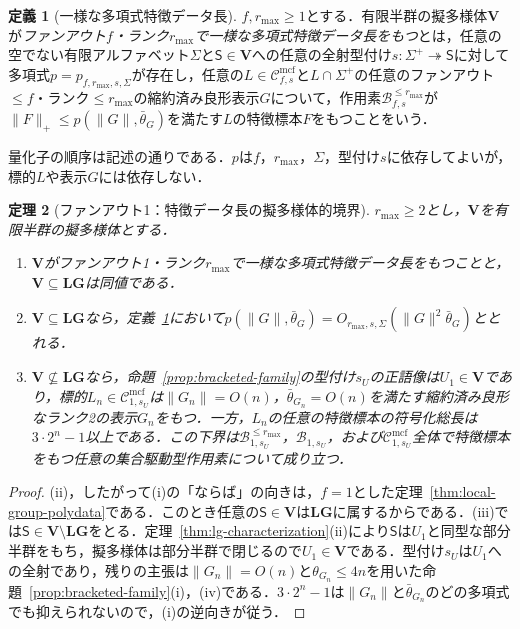 \documentclass[11pt,a4paper]{ltjsarticle}
\numberwithin{equation}{section}
\theoremstyle{plain}
\newtheorem{theorem}{定理}[section]
\theoremstyle{definition}
\newtheorem{definition}[theorem]{定義}
\theoremstyle{remark}
\newcommand{\Cmcf}[2]{\mathcal{C}^{\mathrm{mcf}}_{#1,#2}}
\begin{document}
\begin{definition}[一様な多項式特徴データ長]
\label{def:uniform-polydata}
$f,r_{\max}\ge1$とする．有限半群の擬多様体$\mathbf V$が\emph{ファンアウト$f$・ランク$r_{\max}$で一様な多項式特徴データ長をもつ}とは，任意の空でない有限アルファベット$\Sigma$と$\mathsf S\in\mathbf V$への任意の全射型付け$s:\Sigma^+\twoheadrightarrow\mathsf S$に対して多項式$p=p_{f,r_{\max},s,\Sigma}$が存在し，任意の$L\in\Cmcf{f}{s}$と$L\cap\Sigma^+$の任意のファンアウト$\le f$・ランク$\le r_{\max}$の縮約済み良形表示$G$について，作用素$\mathcal B^{\le r_{\max}}_{f,s}$が$\|F\|_+\le p(\|G\|,\bar\theta_G)$を満たす$L$の特徴標本$F$をもつことをいう．
\end{definition}

量化子の順序は記述の通りである．$p$は$f$，$r_{\max}$，$\Sigma$，型付け$s$に依存してよいが，標的$L$や表示$G$には依存しない．

\begin{theorem}[ファンアウト1：特徴データ長の擬多様体的境界]
\label{thm:fanout-one-data}
$r_{\max}\ge2$とし，$\mathbf V$を有限半群の擬多様体とする．
\begin{enumerate}[label=\textup{(\roman*)},leftmargin=*]
\item $\mathbf V$がファンアウト1・ランク$r_{\max}$で一様な多項式特徴データ長をもつことと，$\mathbf V\subseteq\mathbf{LG}$は同値である．
\item $\mathbf V\subseteq\mathbf{LG}$なら，定義~\ref{def:uniform-polydata}において$p(\|G\|,\bar\theta_G)=O_{r_{\max},s,\Sigma}(\|G\|^2\bar\theta_G)$ととれる．
\item $\mathbf V\not\subseteq\mathbf{LG}$なら，命題~\ref{prop:bracketed-family}の型付け$s_U$の正語像は$U_1\in\mathbf V$であり，標的$L_n\in\Cmcf{1}{s_U}$は$\|G_n\|=O(n)$，$\bar\theta_{G_n}=O(n)$を満たす縮約済み良形なランク2の表示$G_n$をもつ．一方，$L_n$の任意の特徴標本の符号化総長は$3\cdot2^n-1$以上である．この下界は$\mathcal B^{\le r_{\max}}_{1,s_U}$，$\mathcal B_{1,s_U}$，および$\Cmcf{1}{s_U}$全体で特徴標本をもつ任意の集合駆動型作用素について成り立つ．
\end{enumerate}
\end{theorem}

\begin{proof}
(ii)，したがって(i)の「ならば」の向きは，$f=1$とした定理~\ref{thm:local-group-polydata}である．このとき任意の$\mathsf S\in\mathbf V$は$\mathbf{LG}$に属するからである．(iii)では$\mathsf S\in\mathbf V\setminus\mathbf{LG}$をとる．定理~\ref{thm:lg-characterization}(ii)により$\mathsf S$は$U_1$と同型な部分半群をもち，擬多様体は部分半群で閉じるので$U_1\in\mathbf V$である．型付け$s_U$は$U_1$への全射であり，残りの主張は$\|G_n\|=O(n)$と$\theta_{G_n}\le4n$を用いた命題~\ref{prop:bracketed-family}(i)，(iv)である．$3\cdot2^n-1$は$\|G_n\|$と$\bar\theta_{G_n}$のどの多項式でも抑えられないので，(i)の逆向きが従う．
\end{proof}
\end{document}
